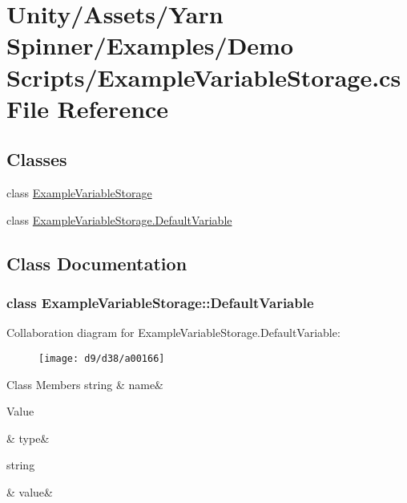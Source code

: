 \hypertarget{a00110}{\section{Unity/\-Assets/\-Yarn Spinner/\-Examples/\-Demo Scripts/\-Example\-Variable\-Storage.cs File Reference}
\label{a00110}
}
\subsection*{Classes}
\begin{DoxyCompactItemize}
\item 
class \hyperlink{a00033}{Example\-Variable\-Storage}
\item 
class \hyperlink{a00033_d6/db8/a00158}{Example\-Variable\-Storage.\-Default\-Variable}
\end{DoxyCompactItemize}


\subsection{Class Documentation}
\label{d6/db8/a00158}
\hypertarget{a00033_d6/db8/a00158}{}
\subsubsection{class Example\-Variable\-Storage\-:\-:Default\-Variable}


Collaboration diagram for Example\-Variable\-Storage.\-Default\-Variable\-:
\nopagebreak
\begin{figure}[H]
\begin{center}
\leavevmode
\texttt{[image: d9/d38/a00166]}
\end{center}
\end{figure}
\begin{DoxyFields}{Class Members}
\hypertarget{a00033_a609feaa53936e7dc42248ff2ba68454a}{string}\label{a00033_a609feaa53936e7dc42248ff2ba68454a}
&
name&
\\
\hline

\hypertarget{a00033_a904347efdca12f40243c7dedb646153d}{Value}\label{a00033_a904347efdca12f40243c7dedb646153d}
&
type&
\\
\hline

\hypertarget{a00033_a0f00ecb21b58aa754a4bbb61edf62818}{string}\label{a00033_a0f00ecb21b58aa754a4bbb61edf62818}
&
value&
\\
\hline

\end{DoxyFields}
